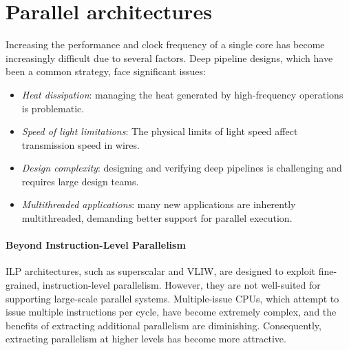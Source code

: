 \section{Parallel architectures}

Increasing the performance and clock frequency of a single core has become increasingly difficult due to several factors. 
Deep pipeline designs, which have been a common strategy, face significant issues:
\begin{itemize}
    \item \textit{Heat dissipation}: managing the heat generated by high-frequency operations is problematic.
    \item \textit{Speed of light limitations}: The physical limits of light speed affect transmission speed in wires.
    \item \textit{Design complexity}: designing and verifying deep pipelines is challenging and requires large design teams.
    \item \textit{Multithreaded applications}: many new applications are inherently multithreaded, demanding better support for parallel execution.
\end{itemize}

\paragraph*{Beyond Instruction-Level Parallelism}
ILP architectures, such as superscalar and VLIW, are designed to exploit fine-grained, instruction-level parallelism. 
However, they are not well-suited for supporting large-scale parallel systems. 
Multiple-issue CPUs, which attempt to issue multiple instructions per cycle, have become extremely complex, and the benefits of extracting additional parallelism are diminishing. 
Consequently, extracting parallelism at higher levels has become more attractive.

